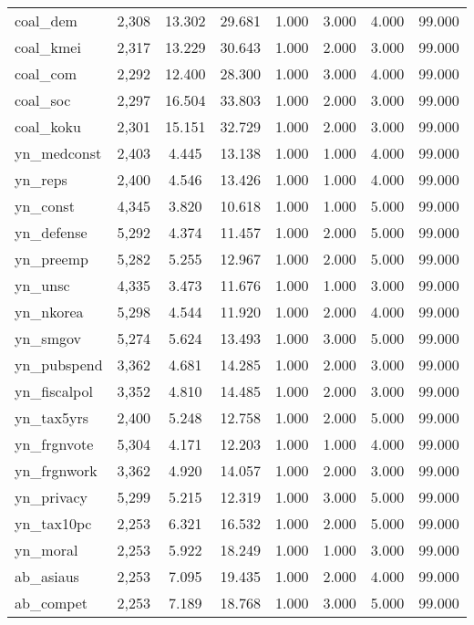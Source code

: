 \begin{table}[!htbp]
\begin{tabular}{@{\extracolsep{5pt}}lccccccc}
coal\_dem & 2,308 & 13.302 & 29.681 & 1.000 & 3.000 & 4.000 & 99.000 \\ 
coal\_kmei & 2,317 & 13.229 & 30.643 & 1.000 & 2.000 & 3.000 & 99.000 \\ 
coal\_com & 2,292 & 12.400 & 28.300 & 1.000 & 3.000 & 4.000 & 99.000 \\ 
coal\_soc & 2,297 & 16.504 & 33.803 & 1.000 & 2.000 & 3.000 & 99.000 \\ 
coal\_koku & 2,301 & 15.151 & 32.729 & 1.000 & 2.000 & 3.000 & 99.000 \\ 
yn\_medconst & 2,403 & 4.445 & 13.138 & 1.000 & 1.000 & 4.000 & 99.000 \\ 
yn\_reps & 2,400 & 4.546 & 13.426 & 1.000 & 1.000 & 4.000 & 99.000 \\ 
yn\_const & 4,345 & 3.820 & 10.618 & 1.000 & 1.000 & 5.000 & 99.000 \\ 
yn\_defense & 5,292 & 4.374 & 11.457 & 1.000 & 2.000 & 5.000 & 99.000 \\ 
yn\_preemp & 5,282 & 5.255 & 12.967 & 1.000 & 2.000 & 5.000 & 99.000 \\ 
yn\_unsc & 4,335 & 3.473 & 11.676 & 1.000 & 1.000 & 3.000 & 99.000 \\ 
yn\_nkorea & 5,298 & 4.544 & 11.920 & 1.000 & 2.000 & 4.000 & 99.000 \\ 
yn\_smgov & 5,274 & 5.624 & 13.493 & 1.000 & 3.000 & 5.000 & 99.000 \\ 
yn\_pubspend & 3,362 & 4.681 & 14.285 & 1.000 & 2.000 & 3.000 & 99.000 \\ 
yn\_fiscalpol & 3,352 & 4.810 & 14.485 & 1.000 & 2.000 & 3.000 & 99.000 \\ 
yn\_tax5yrs & 2,400 & 5.248 & 12.758 & 1.000 & 2.000 & 5.000 & 99.000 \\ 
yn\_frgnvote & 5,304 & 4.171 & 12.203 & 1.000 & 1.000 & 4.000 & 99.000 \\ 
yn\_frgnwork & 3,362 & 4.920 & 14.057 & 1.000 & 2.000 & 3.000 & 99.000 \\ 
yn\_privacy & 5,299 & 5.215 & 12.319 & 1.000 & 3.000 & 5.000 & 99.000 \\ 
yn\_tax10pc & 2,253 & 6.321 & 16.532 & 1.000 & 2.000 & 5.000 & 99.000 \\ 
yn\_moral & 2,253 & 5.922 & 18.249 & 1.000 & 1.000 & 3.000 & 99.000 \\ 
ab\_asiaus & 2,253 & 7.095 & 19.435 & 1.000 & 2.000 & 4.000 & 99.000 \\ 
ab\_compet & 2,253 & 7.189 & 18.768 & 1.000 & 3.000 & 5.000 & 99.000 \\ 

\end{tabular}
\end{table}
